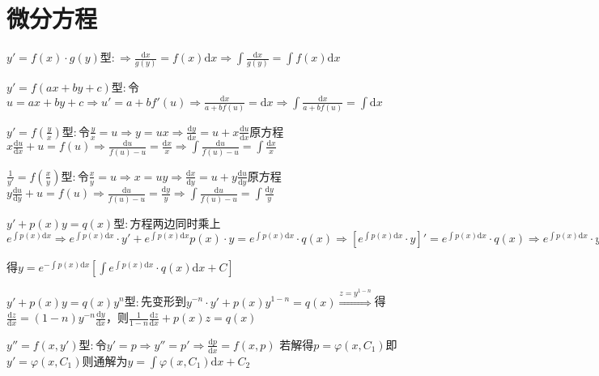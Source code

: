 \section{微分方程}

\begin{spacing}{\hangju}
    $ y' = f(x) \cdot g(y)$型$\colon \Rightarrow \frac{\mathrm{d}x}{g(y)} = f(x)\mathrm{d}x \Rightarrow \int{\frac{\mathrm{d}x}{g(y)}} = \int{f(x)}\mathrm{d}x $

    $y' = f(ax + by + c)$型$\colon$令$u = ax +by + c \Rightarrow u' = a + bf'(u) \Rightarrow \frac{\mathrm{d}x}{a + bf(u)} = \mathrm{d}x \Rightarrow \int{\frac{\mathrm{d}x}{a + bf(u)}} = \int\mathrm{d}x$

    $y' = f(\frac{y}{x})$型$\colon$令$\frac{y}{x} = u \Rightarrow y = ux \Rightarrow \frac{\mathrm{d}y}{\mathrm{d}x} = u + x\frac{\mathrm{d}u}{\mathrm{d}x}$原方程$x\frac{\mathrm{d}u}{\mathrm{d}x} + u = f(u) \Rightarrow \frac{\mathrm{d}u}{f(u)-u} = \frac{\mathrm{d}x}{x} \Rightarrow \int{\frac{\mathrm{d}u}{f(u)-u}} = \int{\frac{\mathrm{d}x}{x}}$

    $\frac{1}{y'} = f(\frac{x}{y})$型$\colon$令$\frac{x}{y} = u \Rightarrow x = uy \Rightarrow \frac{\mathrm{d}x}{\mathrm{d}y} = u + y\frac{\mathrm{d}u}{\mathrm{d}y}$原方程$y\frac{\mathrm{d}u}{\mathrm{d}y} + u = f(u) \Rightarrow \frac{\mathrm{d}u}{f(u)-u} = \frac{\mathrm{d}y}{y} \Rightarrow \int{\frac{\mathrm{d}u}{f(u)-u}} = \int{\frac{\mathrm{d}y}{y}}$

    $y' + p(x)y = q(x)$型$\colon$方程两边同时乘上$e^{\int{p(x)\mathrm{d}x}} \Rightarrow e^{\int{p(x)\mathrm{d}x}} \cdot y' + e^{\int{p(x)\mathrm{d}x}}p(x) \cdot y = e^{\int{p(x)\mathrm{d}x}} \cdot q(x) \Rightarrow \left[e^{\int{p(x)\mathrm{d}x}} \cdot y\right]' = e^{\int{p(x)\mathrm{d}x}} \cdot q(x) \Rightarrow e^{\int{p(x)\mathrm{d}x}} \cdot y = \int{e^{\int{p(x)\mathrm{d}x}} \cdot q(x)}\mathrm{d}x + C$

    \noindent 得$y = e^{-\int{p(x)\mathrm{d}x}}\left[\int{e^{\int{p(x)\mathrm{d}x}} \cdot q(x)\mathrm{d}x} + C\right]$

    \noindent $y' + p(x)y = q(x)y^n$型$\colon$先变形到$y^{-n} \cdot y' + p(x)y^{1-n} = q(x) \stackrel{z = y^{1-n}}{\Longrightarrow}$得$\frac{\mathrm{d}z}{\mathrm{d}x} = (1 - n)y^{-n}\frac{\mathrm{d}y}{\mathrm{d}x}$，则$\frac{1}{1 - n}\frac{\mathrm{d}z}{\mathrm{d}x} + p(x)z = q(x)$

    \noindent $y''=f(x, y')$型$\colon$令$y' = p \Rightarrow y'' = p' \Rightarrow \frac{\mathrm{d}p}{\mathrm{d}x} = f(x, p)$
    若解得$p = \varphi(x, C_1)$即$y' = \varphi(x, C_1)$则通解为$y = \int{\varphi(x, C_1)\mathrm{d}x} +C_2$


\end{spacing}
